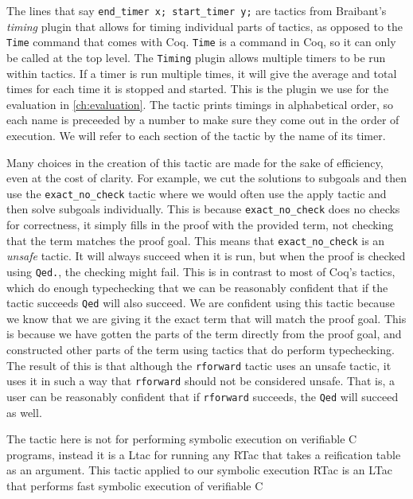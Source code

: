 \documentclass{puthesis}
\begin{document}
The lines that say \lstinline|end_timer x; start_timer y;| are tactics
from Braibant's \emph{timing} plugin that allows for timing individual
parts of tactics, as opposed to the \lstinline|Time| command that
comes with Coq. \lstinline|Time| is a command in Coq, so it can only
be called at the top level. The \lstinline|Timing| plugin allows
multiple timers to be run within tactics. If a timer is run multiple
times, it will give the average and total times for each time it is
stopped and started. This is the plugin we use for the evaluation in
\ref{ch:evaluation}. The tactic prints timings in alphabetical order,
so each name is preceeded by a number to make sure they come out in
the order of execution. We will refer to each section of the tactic by
the name of its timer.

Many choices in the creation of this tactic are made for the sake of
efficiency, even at the cost of clarity. For example, we cut the
solutions to subgoals and then use the
\lstinline|exact_no_check| tactic where we would often use the apply
tactic and then solve subgoals individually. This is because
\lstinline|exact_no_check| does no checks for correctness, it simply
fills in the proof with the provided term, not checking that the term
matches the proof goal. This means that \lstinline|exact_no_check| is
an \emph{unsafe} tactic. It will always succeed when it is run, but
when the proof is checked using \lstinline|Qed.|, the checking might
fail. This is in contrast to most of Coq's tactics, which do enough
typechecking that we can be reasonably confident that if the tactic
succeeds \lstinline|Qed| will also succeed. We are confident using
this tactic because we know that we are giving it the exact term that
will match the proof goal. This is because we have gotten the parts of
the term directly from the proof goal, and constructed other parts of
the term using tactics that do perform typechecking. The result of
this is that although the \lstinline|rforward| tactic uses an unsafe
tactic, it uses it in such a way that \lstinline|rforward| should not
be considered unsafe. That is, a user can be reasonably confident that
if \lstinline|rforward| succeeds, the \lstinline|Qed| will succeed as
well.


The tactic here is not for performing symbolic execution on verifiable
C programs, instead it is a Ltac for running any RTac that takes a
reification table as an argument. This tactic applied to our symbolic
execution RTac is an LTac that performs fast symbolic execution of
verifiable C
\end{document}
